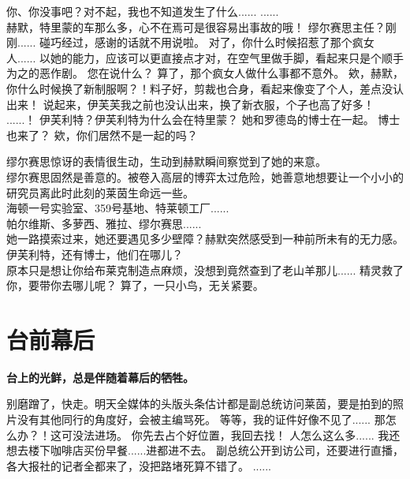 \documentclass[openany]{book}
\begin{document}
\begin{dialogue}
     你、你没事吧？对不起，我也不知道发生了什么......
     ......
    \\
     赫默，特里蒙的车那么多，心不在焉可是很容易出事故的哦！
     缪尔赛思主任？刚刚......
     碰巧经过，感谢的话就不用说啦。
     对了，你什么时候招惹了那个疯女人......
     以她的能力，应该可以更直接点才对，在空气里做手脚，看起来只是个顺手为之的恶作剧。
     您在说什么？
     算了，那个疯女人做什么事都不意外。
     欸，赫默，你什么时候换了新制服啊？！料子好，剪裁也合身，看起来像变了个人，差点没认出来！
     说起来，伊芙芙我之前也没认出来，换了新衣服，个子也高了好多！
     ......！
     伊芙利特？伊芙利特为什么会在特里蒙？
     她和罗德岛的博士在一起。
     博士也来了？
     欸，你们居然不是一起的吗？\par
    缪尔赛思惊讶的表情很生动，生动到赫默瞬间察觉到了她的来意。\\
    缪尔赛思固然是善意的。被卷入高层的博弈太过危险，她善意地想要让一个小小的研究员离此时此刻的莱茵生命远一些。\\
    海顿一号实验室、359号基地、特莱顿工厂......\\
    帕尔维斯、多萝西、雅拉、缪尔赛思......\\
    她一路摸索过来，她还要遇见多少壁障？赫默突然感受到一种前所未有的无力感。
     伊芙利特，还有博士，他们在哪儿？
    \\
     原本只是想让你给布莱克制造点麻烦，没想到竟然查到了老山羊那儿......
     精灵救了你，要带你去哪儿呢？
     算了，一只小鸟，无关紧要。
\end{dialogue}

\chapter{台前幕后}
\begin{center} \textbf{台上的光鲜，总是伴随着幕后的牺牲。}\end{center} \par
\clearpage
\begin{dialogue}
     别磨蹭了，快走。明天全媒体的头版头条估计都是副总统访问莱茵，要是拍到的照片没有其他同行的角度好，会被主编骂死。
     等等，我的证件好像不见了......
     那怎么办？！这可没法进场。
     你先去占个好位置，我回去找！
     人怎么这么多......
     我还想去楼下咖啡店买份早餐......进都进不去。
     副总统公开到访公司，还要进行直播，各大报社的记者全都来了，没把路堵死算不错了。
     ......
\end{dialogue}
\end{document}

